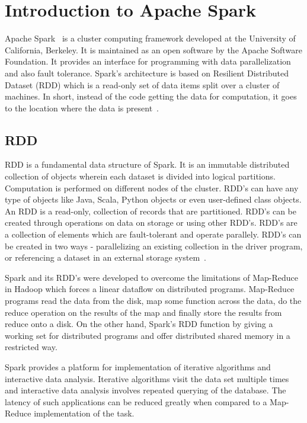 \section{Introduction to Apache Spark}
Apache Spark~\cite{hid-sp18-408-ApacheSpark} is a cluster computing framework 
developed at the University of California, Berkeley. It is maintained as an open
software by the Apache Software Foundation. It provides an interface for 
programming with data parallelization and also fault tolerance. Spark's 
architecture is based on Resilient Distributed Dataset (RDD) which is a 
read-only set of data items split over a cluster of machines. In short, 
instead of the code getting the data for computation, it goes to the location 
where the data is present~\cite{hid-sp18-408-Spark}. 

\subsection{RDD}
RDD is a fundamental data structure of Spark. It is an immutable distributed 
collection of objects wherein each dataset is divided into logical partitions. 
Computation is performed on different nodes of the cluster. RDD's can have any 
type of objects like Java, Scala, Python objects or even user-defined class 
objects. An RDD is a read-only, collection of records that are partitioned. 
RDD's can be created through operations on data on storage or using other RDD's.
RDD's are a collection of elements which are fault-tolerant and operate 
parallely. RDD's can be created in two ways - parallelizing an existing 
collection in the driver program, or referencing a dataset in an external 
storage system~\cite{hid-sp18-408-Spark-RDD}.

Spark and its RDD's were developed to overcome the limitations of Map-Reduce in 
Hadoop which forces a linear dataflow on distributed programs. Map-Reduce 
programs read the data from the disk, map some function across the data, do the 
reduce operation on the results of the map and finally store the results from 
reduce onto a disk. On the other hand, Spark's RDD function by giving a working 
set for distributed programs and offer distributed shared memory in a restricted
way. 

Spark provides a platform for implementation of iterative algorithms and 
interactive data analysis. Iterative algorithms visit the data set multiple 
times and interactive data analysis involves repeated querying of the database. 
The latency of such applications can be reduced greatly when compared to a 
Map-Reduce implementation of the task. 

